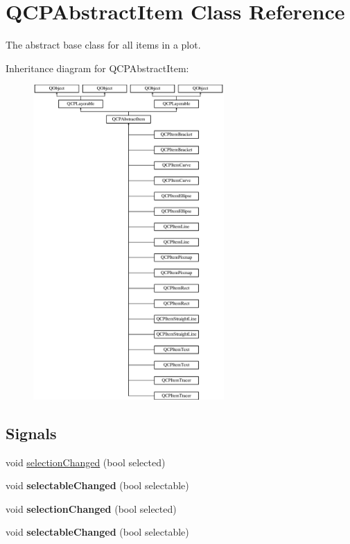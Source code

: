 \hypertarget{class_q_c_p_abstract_item}{}\section{Q\+C\+P\+Abstract\+Item Class Reference}
\label{class_q_c_p_abstract_item}


The abstract base class for all items in a plot.  


Inheritance diagram for Q\+C\+P\+Abstract\+Item\+:\begin{figure}[H]
\begin{center}
\leavevmode
\includegraphics[height=12.000000cm]{class_q_c_p_abstract_item}
\end{center}
\end{figure}
\subsection*{Signals}
\begin{DoxyCompactItemize}
\item 
void \hyperlink{class_q_c_p_abstract_item_aa5cffb034fc65dbb91c77e02c1c14251}{selection\+Changed} (bool selected)
\item 
\mbox{\label{class_q_c_p_abstract_item_a5b266c11aac61cb511901f3911dac2a3}} 
void {\bfseries selectable\+Changed} (bool selectable)
\item 
\mbox{\label{class_q_c_p_abstract_item_aa5cffb034fc65dbb91c77e02c1c14251}} 
void {\bfseries selection\+Changed} (bool selected)
\item 
\mbox{\label{class_q_c_p_abstract_item_a5b266c11aac61cb511901f3911dac2a3}} 
void {\bfseries selectable\+Changed} (bool selectable)
\end{DoxyCompactItemize}
